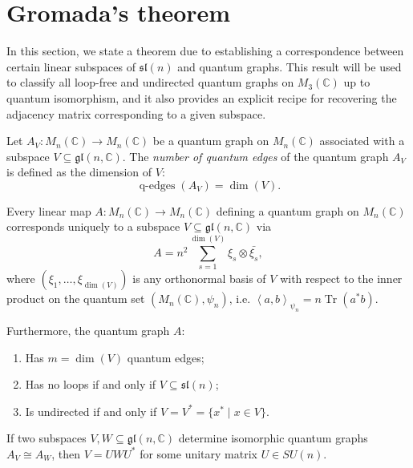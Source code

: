\section{Gromada's theorem}
\label{sec:gromada-theorem}

In this section, we state a theorem due to \textcite{gromada22}
establishing a correspondence between certain linear
subspaces of \( \mathfrak{sl}(n) \) and quantum graphs.
This result will
be used to classify all loop-free and undirected quantum graphs on
\( M_{3}(\mathbb{C}) \) up to quantum isomorphism, and it also
provides an explicit
recipe for recovering the adjacency matrix corresponding to a given
subspace.

\begin{definition}
    Let \( A_V \colon M_n (\mathbb{C}) \to M_n (\mathbb{C}) \) be a
    quantum graph on \( M_n (\mathbb{C}) \)
    associated with a subspace \( V \subseteq
    \mathfrak{gl}(n, \mathbb{C}) \). The \emph{number of quantum
    edges} of the quantum graph \( A_V \) is defined as the dimension
    of \( V \):
    \[
        \operatorname{q-edges}(A_V) = \dim(V).
    \]
\end{definition}

\begin{theorem}
    \label{thm:gromada}
    Every linear map \( A \colon M_n (\mathbb{C}) \to M_n
    (\mathbb{C}) \) defining a quantum
    graph on \( M_n (\mathbb{C}) \) corresponds uniquely to a subspace \( V
    \subseteq \mathfrak{gl}(n, \mathbb{C}) \) via
    \[
        A = n^2 \sum_{s=1}^{\dim(V)} \xi_s \otimes \bar{\xi_s},
    \]
    where \( (\xi_1,\dots,\xi_{\dim(V)}) \) is any orthonormal basis
    of \( V \) with respect to the inner product on the quantum set
    \( (M_n (\mathbb{C}), \psi_n) \), i.e. \( \left\langle a, b
    \right\rangle_{\psi_n} = n \operatorname{Tr}(a^* b) \).

    Furthermore, the quantum graph \( A \):
    \begin{enumerate}
        \item Has \( m = \dim(V) \) quantum edges;
        \item Has no loops if and only if \( V \subseteq
            \mathfrak{sl}(n) \);
        \item Is undirected if and only if \( V = V^* = \{x^* \mid x
            \in V\} \).
    \end{enumerate}

    If two subspaces \( V, W \subseteq \mathfrak{gl}(n, \mathbb{C}) \)
    determine isomorphic quantum graphs \( A_V \cong A_W \), then \(
    V = UWU^* \) for some unitary matrix \( U \in SU(n) \).
\end{theorem}

